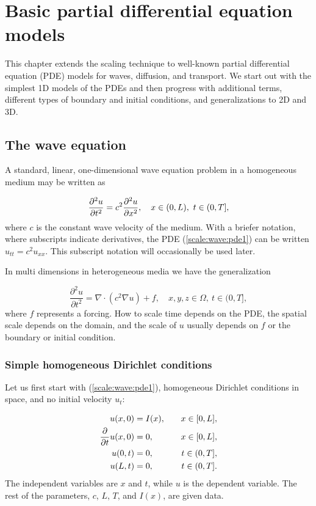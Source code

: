 \documentclass[graybox,envcountchap,sectrefs,final]{svmonodo}
\begin{document}
\chapter{Basic partial differential equation models}

This chapter extends the scaling technique to well-known partial differential
equation (PDE) models for waves, diffusion, and transport.
We start out with the simplest 1D models of the PDEs and then progress
with additional terms, different types of boundary and initial conditions,
and generalizations to 2D and 3D.

\section{The wave equation}
\label{sec:scale:wave}

A standard, linear, one-dimensional wave equation problem
in a homogeneous medium may be written as

\begin{equation}
\frac{\partial^2 u}{\partial t^2} =
c^2 {\partial^2 u\over\partial x^2}, \quad  x\in (0,L),\ t\in (0,T],
\label{scale:wave:pde1}
\end{equation}
where $c$ is the constant wave velocity of the medium.
With a briefer notation, where subscripts indicate derivatives,
the PDE (\ref{scale:wave:pde1}) can be written
$u_{tt}=c^2u_{xx}$. This subscript notation will occasionally be
used later.

In multi dimensions in heterogeneous media we have the generalization

\begin{equation}
\frac{\partial^2 u}{\partial t^2} =
\nabla\cdot\left(c^2 \nabla u\right) + f, \quad  x,y,z\in \Omega,\ t\in (0,T],
\label{scale:wave:pde1:3D}
\end{equation}
where $f$ represents a forcing.
How to scale time depends on the PDE, the spatial scale depends on
the domain, and the scale of $u$ usually depends on $f$ or the
boundary or initial condition.

\subsection{Simple homogeneous Dirichlet conditions}

Let us first start with (\ref{scale:wave:pde1}),
homogeneous Dirichlet conditions in space, and
no initial velocity $u_t$:

\begin{align}
u(x,0) &= I(x), \quad &x\in [0,L],
\label{scale:wave:pde1:ic:u}\\ 
{\partial\over\partial t}u(x,0) &= 0, \quad & x\in [0,L],
\label{scale:wave:pde1:ic:ut}\\ 
u(0,t) & = 0, \quad  & t\in (0,T],
\label{scale:wave:pde1:bc:0}\\ 
u(L,t) & = 0, \quad  & t\in (0,T].
\label{scale:wave:pde1:bc:L}
\end{align}
The independent variables are $x$ and $t$, while $u$ is the dependent
variable.
The rest of the parameters, $c$, $L$, $T$, and $I(x)$, are given data.
\end{document}
